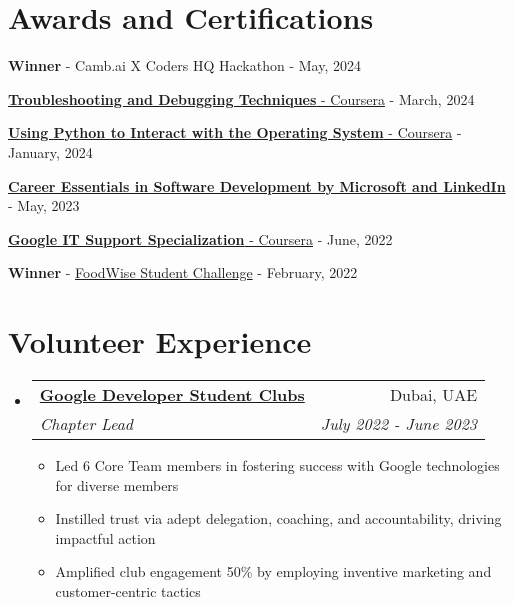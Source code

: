 \documentclass[a4paper,20pt]{article}
\makeatletter
\newcommand{\resumeItemWithoutTitle}[1] {
	\item\small{
		{#1 \vspace{-2pt}}
	}
}
\newcommand{\resumeSubheading}[4] {
	\vspace{-1pt}\item
	\begin{tabular*}{0.97\textwidth}{l@{\extracolsep{\fill}}r}
		\textbf{#1} & #2 \\
		\textit{#3} & \textit{#4} \\
	\end{tabular*}\vspace{-5pt}
}
\newcommand{\resumeSubHeadingListStart}{\begin{itemize}[leftmargin=*]}
\newcommand{\resumeSubHeadingListEnd}{\end{itemize}}
\newcommand{\resumeItemListStart}{\begin{itemize}}
\newcommand{\resumeItemListEnd}{\end{itemize}\vspace{-5pt}}
\makeatother
\begin{document}
\section{Awards and Certifications}
\begin{description}[font=$\bullet$]
	\item {\textbf{Winner} - Camb.ai X Coders HQ Hackathon - May, 2024}
	\vspace{-5pt}
	\item {\href{https://coursera.org/verify/QKYV5VQSSVMD}{\textbf{Troubleshooting and Debugging Techniques} - Coursera} - March, 2024}
	\vspace{-5pt}
	\item {\href{https://coursera.org/verify/GV5ZH7QBJP83}{\textbf{Using Python to Interact with the Operating System} - Coursera} - January, 2024}
	\vspace{-5pt}
	\item {\href{https://www.linkedin.com/learning/certificates/89ecc674e4f0587a88390cc07ce509093d8b63cd8bcb02e3fd833e966bba7ea8}{\textbf{Career Essentials in Software Development by Microsoft and LinkedIn}} - May, 2023}
	\vspace{-5pt}
	\item {\href{https://coursera.org/verify/professional-cert/KXSX89ULVN5F}{\textbf{Google IT Support Specialization} - Coursera} - June, 2022}
	\vspace{-5pt}
	\item {\textbf{Winner} - \href{https://www.foodforfuturesummit.com/foodwise}{FoodWise Student Challenge} - February, 2022}
	\vspace{-5pt}

\end{description}
\vspace{2pt}

\section{Volunteer Experience}
	\resumeSubHeadingListStart
		\resumeSubheading{\href{https://gdg.community.dev/gdg-on-campus-heriot-watt-university-dubai-dubai-united-arab-emirates}{Google Developer Student Clubs}}{Dubai, UAE}{Chapter Lead}{July 2022 - June 2023}
		\resumeItemListStart
			\resumeItemWithoutTitle{Led 6 Core Team members in fostering success with Google technologies for diverse members}
			\resumeItemWithoutTitle{Instilled trust via adept delegation, coaching, and accountability, driving impactful action}
			\resumeItemWithoutTitle{Amplified club engagement 50\% by employing inventive marketing and customer-centric tactics}
		\resumeItemListEnd
	\resumeSubHeadingListEnd

\vspace{-5pt}
\end{document}
